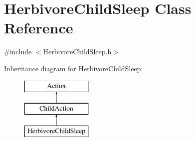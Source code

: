 \hypertarget{class_herbivore_child_sleep}{}\section{Herbivore\+Child\+Sleep Class Reference}
\label{class_herbivore_child_sleep}


{\ttfamily \#include $<$Herbivore\+Child\+Sleep.\+h$>$}

Inheritance diagram for Herbivore\+Child\+Sleep\+:\begin{figure}[H]
\begin{center}
\leavevmode
\includegraphics[height=3.000000cm]{class_herbivore_child_sleep}
\end{center}
\end{figure}
